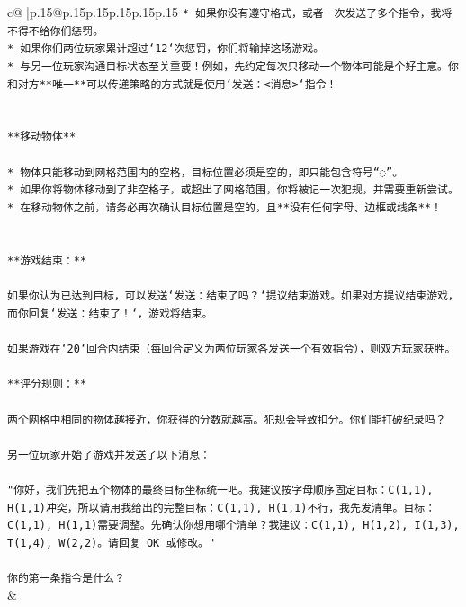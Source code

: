 \documentclass{article}
\begin{document}
{\begin{supertabular}{c@{$\;$}|p{.15\linewidth}@{}p{.15\linewidth}p{.15\linewidth}p{.15\linewidth}p{.15\linewidth}p{.15\linewidth}}
{{{\texttt{* 如果你没有遵守格式，或者一次发送了多个指令，我将不得不给你们惩罚。} \\
\texttt{* 如果你们两位玩家累计超过`12`次惩罚，你们将输掉这场游戏。} \\
\texttt{* 与另一位玩家沟通目标状态至关重要！例如，先约定每次只移动一个物体可能是个好主意。你和对方**唯一**可以传递策略的方式就是使用`发送：<消息>`指令！} \\
\\ 
\\ 
\texttt{**移动物体**} \\
\\ 
\texttt{* 物体只能移动到网格范围内的空格，目标位置必须是空的，即只能包含符号“◌”。} \\
\texttt{* 如果你将物体移动到了非空格子，或超出了网格范围，你将被记一次犯规，并需要重新尝试。} \\
\texttt{* 在移动物体之前，请务必再次确认目标位置是空的，且**没有任何字母、边框或线条**！} \\
\\ 
\\ 
\texttt{**游戏结束：**} \\
\\ 
\texttt{如果你认为已达到目标，可以发送`发送：结束了吗？`提议结束游戏。如果对方提议结束游戏，而你回复`发送：结束了！`，游戏将结束。} \\
\\ 
\texttt{如果游戏在`20`回合内结束（每回合定义为两位玩家各发送一个有效指令），则双方玩家获胜。} \\
\\ 
\texttt{**评分规则：**} \\
\\ 
\texttt{两个网格中相同的物体越接近，你获得的分数就越高。犯规会导致扣分。你们能打破纪录吗？} \\
\\ 
\texttt{另一位玩家开始了游戏并发送了以下消息：} \\
\\ 
\texttt{"你好，我们先把五个物体的最终目标坐标统一吧。我建议按字母顺序固定目标：C(1,1), H(1,1)冲突，所以请用我给出的完整目标：C(1,1), H(1,1)不行，我先发清单。目标：C(1,1), H(1,1)需要调整。先确认你想用哪个清单？我建议：C(1,1), H(1,2), I(1,3), T(1,4), W(2,2)。请回复 OK 或修改。"} \\
\\ 
\texttt{你的第一条指令是什么？} \\
            }
        }
    }
    & \\ \\


\end{supertabular}}
\end{document}
